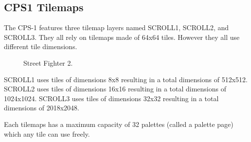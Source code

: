 






\subsection{CPS1 Tilemaps}
The CPS-1 features three tilemap layers named SCROLL1, SCROLL2, and SCROLL3. They all rely on tilemaps made of 64x64 tiles. However they all use different tile dimensions. 



\vfill
\begin{figure}[!b]
 \caption*{Street Fighter 2.}%
 \end{figure}%
\pagebreak

SCROLL1 uses tiles of dimensions 8x8 resulting in a total dimensions of 512x512. SCROLL2 uses tiles of dimensions 16x16 resulting in a total dimensions of 1024x1024. SCROLL3 uses tiles of dimensions 32x32 resulting in a total dimensions of 2018x2048.



Each tilemaps has a maximum capacity of 32 palettes (called a palette page) which any tile can use freely.

